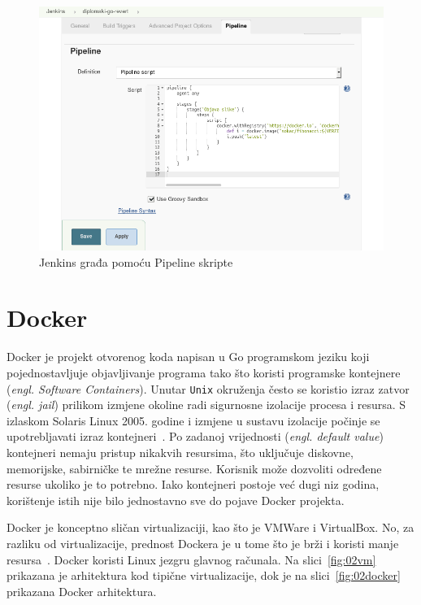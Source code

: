 \begin{figure}[h]
    \centering
    \includegraphics[width=\textwidth]{img/02/jenkins_pipeline.png}
    \caption{Jenkins građa pomoću Pipeline skripte}%
    \label{fig:02jenkins_pipeline}
\end{figure}

\section{Docker}
Docker je projekt otvorenog koda napisan u Go programskom jeziku koji pojednostavljuje objavljivanje
programa tako što koristi programske kontejnere (\textit{engl. Software Containers}). Unutar
\texttt{Unix} okruženja često se koristio izraz zatvor (\textit{engl. jail}) prilikom izmjene
okoline radi sigurnosne izolacije procesa i resursa. S izlaskom Solaris Linux 2005.  godine i
izmjene u sustavu izolacije počinje se upotrebljavati izraz kontejneri~\citep{nickoloff2016docker}.
Po zadanoj vrijednosti (\textit{engl. default value}) kontejneri nemaju pristup nikakvih resursima,
što uključuje diskovne, memorijske, sabirničke te mrežne resurse. Korisnik može dozvoliti određene
resurse ukoliko je to potrebno. Iako kontejneri postoje već dugi niz godina, korištenje istih nije
bilo jednostavno sve do pojave Docker projekta.

Docker je konceptno sličan virtualizaciji, kao što je VMWare i VirtualBox. No, za razliku od
virtualizacije, prednost Dockera je u tome što je brži i koristi manje
resursa~\citep{leszko2017continuous}. Docker koristi Linux jezgru glavnog računala. Na
slici~\ref{fig:02vm} prikazana je arhitektura kod tipične virtualizacije, dok je na
slici~\ref{fig:02docker} prikazana Docker arhitektura.

